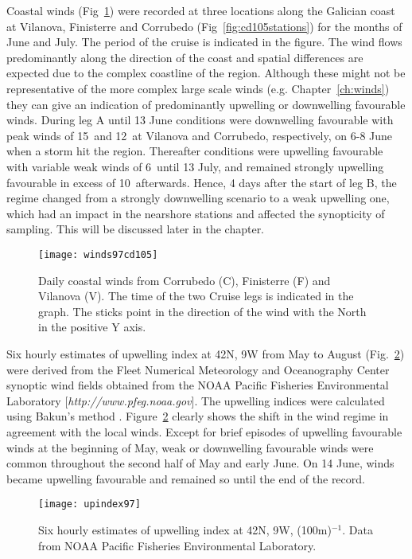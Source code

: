 Coastal winds (Fig~\ref{fig:cd105winds}) were recorded at three
locations along the Galician coast at Vilanova, Finisterre and
Corrubedo (Fig~\ref{fig:cd105stations}) for the months of June and
July. The period of the cruise is indicated in the figure. The
wind flows predominantly along the direction of the coast and
spatial differences are expected due to the complex coastline of
the region. Although these might not be representative of the more
complex large scale winds (e.g. Chapter~\ref{ch:winds}) they can
give an indication of predominantly upwelling or downwelling
favourable winds. During leg A until 13 June conditions were
downwelling favourable with peak winds of 15\vel\, and 12\vel\, at
Vilanova and Corrubedo, respectively, on 6-8 June when a storm hit
the region. Thereafter conditions were upwelling favourable with
variable weak winds of 6\vel\, until 13 July, and remained
strongly upwelling favourable in excess of 10\vel\, afterwards.
Hence, 4 days after the start of leg B, the regime changed from a
strongly downwelling scenario to a weak upwelling one, which had
an impact in the nearshore stations and affected the synopticity
of sampling. This will be discussed later in the chapter.
\begin{figure}[ht]
\centering
\texttt{[image: winds97cd105]}
\caption{Daily coastal winds from Corrubedo (C), Finisterre (F)
and Vilanova (V). The time of the two Cruise legs is indicated in
the graph. The sticks point in the direction of the wind with the
North in the positive Y axis.} \label{fig:cd105winds}
\end{figure}

Six hourly estimates of upwelling index at 42\deg N, 9\deg W from
May to August (Fig.~\ref{fig:cd105upindx}) were derived from the
Fleet Numerical Meteorology and Oceanography Center synoptic wind
fields obtained from the NOAA Pacific Fisheries Environmental
Laboratory [{\it http://www.pfeg.noaa.gov}]. The upwelling indices
were calculated using Bakun's method \citep{Bakun73}.
Figure~\ref{fig:cd105upindx} clearly shows the shift in the wind
regime in agreement with the local winds. Except for brief
episodes of upwelling favourable winds at the beginning of May,
weak or downwelling favourable winds were common throughout the
second half of May and early June. On 14 June, winds became
upwelling favourable and remained so until the end of the record.
\begin{figure}[ht]
\centering
\texttt{[image: upindex97]}
\caption{Six hourly estimates of upwelling index at 42\deg N,
9\deg W, \tra(100m)$^{-1}$. Data from NOAA Pacific Fisheries
Environmental Laboratory. } \label{fig:cd105upindx}
\end{figure}

